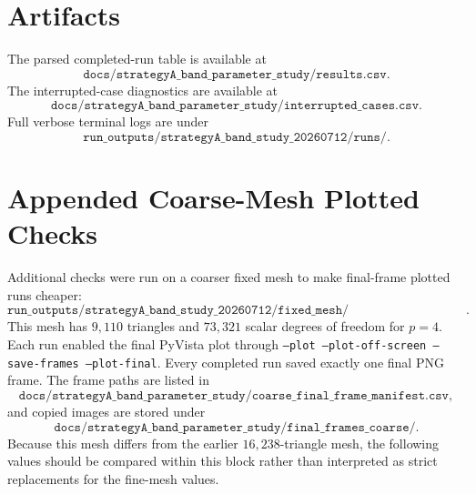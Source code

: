 \documentclass[11pt]{article}
\begin{document}
\section{Artifacts}

The parsed completed-run table is available at
\[
\texttt{docs/strategyA\_band\_parameter\_study/results.csv}.
\]
The interrupted-case diagnostics are available at
\[
\texttt{docs/strategyA\_band\_parameter\_study/interrupted\_cases.csv}.
\]
Full verbose terminal logs are under
\[
\texttt{run\_outputs/strategyA\_band\_study\_20260712/runs/}.
\]

\section{Appended Coarse-Mesh Plotted Checks}

Additional checks were run on a coarser fixed mesh to make final-frame plotted
runs cheaper:
\[
\texttt{run\_outputs/strategyA\_band\_study\_20260712/fixed\_mesh/smooth\_star\_h010\_n220.msh}.
\]
This mesh has \(9{,}110\) triangles and \(73{,}321\) scalar degrees of freedom
for \(p=4\).  Each run enabled the final PyVista plot through
\texttt{--plot --plot-off-screen --save-frames --plot-final}.  Every completed
run saved exactly one final PNG frame.  The frame paths are listed in
\[
\texttt{docs/strategyA\_band\_parameter\_study/coarse\_final\_frame\_manifest.csv},
\]
and copied images are stored under
\[
\texttt{docs/strategyA\_band\_parameter\_study/final\_frames\_coarse/}.
\]
Because this mesh differs from the earlier \(16{,}238\)-triangle mesh, the
following values should be compared within this block rather than interpreted
as strict replacements for the fine-mesh values.
\end{document}
